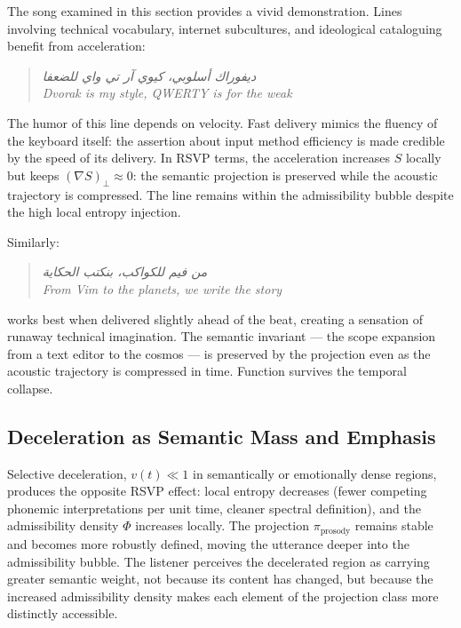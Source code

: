 \documentclass[12pt, a4paper]{article}
\theoremstyle{essaystyle}
\begin{document}
The song examined in this section provides a vivid demonstration. Lines involving
technical vocabulary, internet subcultures, and ideological cataloguing benefit from
acceleration:

\begin{quote}
\textit{ديفوراك أسلوبي، كيوي آر تي واي للضعفا} \\
\textit{Dvorak is my style, QWERTY is for the weak}
\end{quote}

The humor of this line depends on velocity. Fast delivery mimics the fluency of the
keyboard itself: the assertion about input method efficiency is made credible by the
speed of its delivery. In RSVP terms, the acceleration increases $S$ locally but keeps
$(\nabla S)_\perp \approx 0$: the semantic projection is preserved while the acoustic
trajectory is compressed. The line remains within the admissibility bubble despite the
high local entropy injection.

Similarly:

\begin{quote}
\textit{من فيم للكواكب، بنكتب الحكاية} \\
\textit{From Vim to the planets, we write the story}
\end{quote}

works best when delivered slightly ahead of the beat, creating a sensation of runaway
technical imagination. The semantic invariant --- the scope expansion from a text editor
to the cosmos --- is preserved by the projection even as the acoustic trajectory is
compressed in time. Function survives the temporal collapse.

\subsection{Deceleration as Semantic Mass and Emphasis}

Selective deceleration, $v(t) \ll 1$ in semantically or emotionally dense regions,
produces the opposite RSVP effect: local entropy decreases (fewer competing phonemic
interpretations per unit time, cleaner spectral definition), and the admissibility
density $\Phi$ increases locally. The projection $\pi_{\mathrm{prosody}}$ remains
stable and becomes more robustly defined, moving the utterance deeper into the
admissibility bubble. The listener perceives the decelerated region as carrying greater
semantic weight, not because its content has changed, but because the increased
admissibility density makes each element of the projection class more distinctly
accessible.
\end{document}
